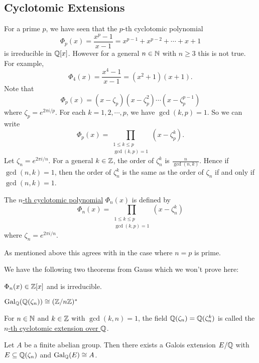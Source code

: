 \documentclass[11pt]{article}
\begin{document}
\subsection{Cyclotomic Extensions}

For a prime $p$, we have seen that the $p$-th cyclotomic polynomial
\[\Phi_p(x)=\frac{x^p-1}{x-1}=x^{p-1}+x^{p-2}+\cdots+x+1\]
is irreducible in $\mathbb{Q}[x]$. However for a general $n\in\mathbb{N}$ with $n\geq 3$ this is not true. For example,
\[\Phi_4(x)=\frac{x^4-1}{x-1}=(x^2+1)(x+1).\]
Note that
\[\Phi_p(x)=(x-\zeta_p)(x-\zeta_p^2)\cdots(x-\zeta_p^{p-1})\]
where $\zeta_p=e^{2\pi i/p}$. For each $k=1,2,\cdots,p$, we have $\gcd(k,p)=1$. So we can write
\[\Phi_p(x)=\prod\limits_{\substack{1\leq k\leq p\\\gcd(k,p)=1}}(x-\zeta_p^k).\]
Let $\zeta_n=e^{2\pi i/n}$. For a general $k\in\mathbb{Z}$, the order of $\zeta_n^k$ is $\frac{n}{\gcd(n,k)}$. Hence if $\gcd(n,k)=1$, then the order of $\zeta_n^k$ is the same as the order of $\zeta_n$ if and only if $\gcd(n,k)=1$.

\begin{definition}
    The \ul{$n$-th cyclotomic polynomial} $\Phi_n(x)$ is defined by
    \[\Phi_n(x)=\prod\limits_{\substack{1\leq k\leq p\\\gcd(k,p)=1}}(x-\zeta_n^k)\]
    where $\zeta_n=e^{2\pi i/n}$.
\end{definition}

\begin{remark}
    As mentioned above this agrees with  in the case where $n=p$ is prime.
\end{remark}

We have the following two theorems from Gauss which we won't prove here:

\begin{theorem}[Gauss]
    $\Phi_n(x)\in\mathbb{Z}[x]$ and is irreducible.
\end{theorem}

\begin{theorem}[Gauss]
    $\operatorname{Gal}_{\mathbb{Q}}(\mathbb{Q}(\zeta_n))\cong(\mathbb{Z}/n\mathbb{Z})^*$
\end{theorem}

\begin{definition}
    For $n\in\mathbb{N}$ and $k\in\mathbb{Z}$ with $\gcd(k,n)=1$, the field $\mathbb{Q}(\zeta_n)=\mathbb{Q}(\zeta_n^k)$ is called the \ul{$n$-th cyclotomic extension over $\mathbb{Q}$}.
\end{definition}

\begin{theorem}
    Let $A$ be a finite abelian group. Then there exists a Galois extension $E/\mathbb{Q}$ with $E\subseteq\mathbb{Q}(\zeta_n)$ and $\operatorname{Gal}_{\mathbb{Q}}(E)\cong A$.
\end{theorem}
\end{document}
